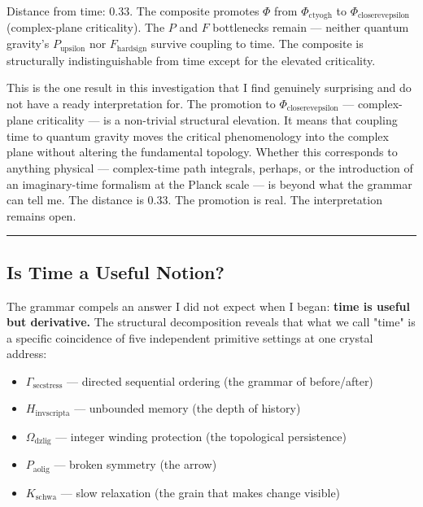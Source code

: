 \documentclass[12pt,a4paper]{article}
\begin{document}
Distance from time: 0.33. The composite promotes $\Phi$ from $\Phi_{\text{ctyogh}}$ to $\Phi_{\text{closerevepsilon}}$ (complex-plane criticality). The $P$ and $F$ bottlenecks remain --- neither quantum gravity's $P_{\text{upsilon}}$ nor $F_{\text{hardsign}}$ survive coupling to time. The composite is structurally indistinguishable from time except for the elevated criticality.

This is the one result in this investigation that I find genuinely surprising and do not have a ready interpretation for. The promotion to $\Phi_{\text{closerevepsilon}}$ --- complex-plane criticality --- is a non-trivial structural elevation. It means that coupling time to quantum gravity moves the critical phenomenology into the complex plane without altering the fundamental topology. Whether this corresponds to anything physical --- complex-time path integrals, perhaps, or the introduction of an imaginary-time formalism at the Planck scale --- is beyond what the grammar can tell me. The distance is 0.33. The promotion is real. The interpretation remains open.

\begin{center}
\rule{0.5\textwidth}{0.4pt}
\end{center}

\subsection{Is Time a Useful Notion?}

The grammar compels an answer I did not expect when I began: \textbf{time is useful but derivative.} The structural decomposition reveals that what we call "time" is a specific coincidence of five independent primitive settings at one crystal address:

\begin{itemize}
    \item $\Gamma_{\text{secstress}}$ --- directed sequential ordering (the grammar of before/after)
    \item $H_{\text{invscripta}}$ --- unbounded memory (the depth of history)
    \item $\Omega_{\text{dzlig}}$ --- integer winding protection (the topological persistence)
    \item $P_{\text{aolig}}$ --- broken symmetry (the arrow)
    \item $K_{\text{schwa}}$ --- slow relaxation (the grain that makes change visible)
\end{itemize}
\end{document}
